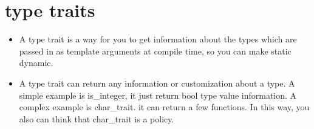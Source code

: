 \documentclass[a4paper,11pt,twoside]{book}
\begin{document}
\section{type traits}


\begin{itemize}
	\item A type trait is a way for you to get information about the types which are passed in as template arguments at compile time, so you can make static dynamic. 
	
	\item A type trait can return any information or customization about a type. A simple example is is\_integer, it just return bool type value information. A complex example is char\_trait. it can return a few functions. In this way, you also can think that char\_trait is a policy. 
	
\end{itemize}
\end{document}
